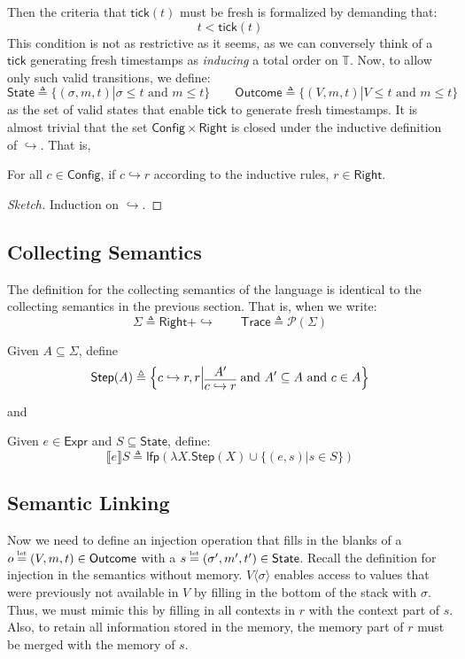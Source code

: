 \documentclass[acmsmall,screen,review]{acmart}\settopmatter{printfolios=true,printccs=false,printacmref=false}
\newcommand*{\pset}{\mathcal{P}}
\newcommand*{\Expr}{\mathsf{Expr}}
\newcommand*{\Time}{\mathbb{T}}
\newcommand*{\ctx}{\sigma}
\newcommand*{\mem}{m}
\newcommand*{\Trace}{\mathsf{Trace}}
\newcommand*{\Config}{\mathsf{Config}}
\newcommand*{\config}{c}
\newcommand*{\Right}{\mathsf{Right}}
\newcommand*{\rightst}{r}
\newcommand*{\texteq}[1]{\stackrel{\mathclap{\tiny\normalfont\mbox{#1}}}{=}}
\newcommand*{\State}{\mathsf{State}}
\newcommand*{\Outcome}{\mathsf{Outcome}}
\newcommand*{\lfp}{\mathsf{lfp}}
\newcommand*{\semarrow}{\hookrightarrow}
\newcommand*{\sembracket}[1]{\lBrack{#1}\rBrack}
\newcommand*{\tick}{\mathsf{tick}}
\newcommand*{\inject}[2]{{#2}\langle{#1}\rangle}
\begin{document}
Then the criteria that $\tick(t)$ must be fresh is formalized by demanding that:
\[t < \tick(t)\]
This condition is not as restrictive as it seems, as we can conversely think of a $\tick$ generating fresh timestamps as \emph{inducing} a total order on $\Time$.
Now, to allow only such valid transitions, we define:
\[
  \State\triangleq\{(\ctx,\mem,t)|\ctx\le t\text{ and }\mem\le t\}\qquad
  \Outcome\triangleq\{(V,\mem,t)|V\le t\text{ and }\mem\le t\}
\]
as the set of valid states that enable $\tick$ to generate fresh timestamps.
It is almost trivial that the set $\Config\times\Right$ is closed under the inductive definition of $\semarrow$.
That is,
\begin{lemma}
  For all $\config\in\Config$, if $\config\semarrow\rightst$ according to the inductive rules, $\rightst\in\Right$.
\end{lemma}
\begin{proof}[Sketch]
  Induction on $\semarrow$.
\end{proof}

\subsection{Collecting Semantics}
The definition for the collecting semantics of the language is identical to the collecting semantics in the previous section.
That is, when we write:
\[\Sigma\triangleq\Right+\semarrow\qquad\Trace\triangleq\pset(\Sigma)\]
\begin{definition}
  Given $A\subseteq \Sigma$, define
  \[
    \mathsf{Step}(A)\triangleq
    \left\{\config\semarrow\rightst, \rightst\middle|
    \begin{prooftree}[center=true]
      \hypo{A'}\infer1{\config\semarrow\rightst}
    \end{prooftree}\text{ and }
    A'\subseteq A\text{ and }\config\in A
    \right\}
  \]
\end{definition}
and
\begin{definition}
  Given $e\in\Expr$ and $S\subseteq\State$, define:
  \[
    \sembracket{e}S\triangleq\lfp(\lambda X.\mathsf{Step}(X)\cup\{(e,s)|s\in S\})
  \]
\end{definition}
\subsection{Semantic Linking}
Now we need to define an injection operation that fills in the blanks of a $o\texteq{let}(V,\mem,t)\in\Outcome$ with a $s\texteq{let}(\ctx',\mem',t')\in\State$.
Recall the definition for injection in the semantics without memory.
$\inject{\ctx}{V}$ enables access to values that were previously not available in $V$ by filling in the bottom of the stack with $\ctx$.
Thus, we must mimic this by filling in all contexts in $r$ with the context part of $s$.
Also, to retain all information stored in the memory, the memory part of $r$ must be merged with the memory of $s$.
\end{document}
